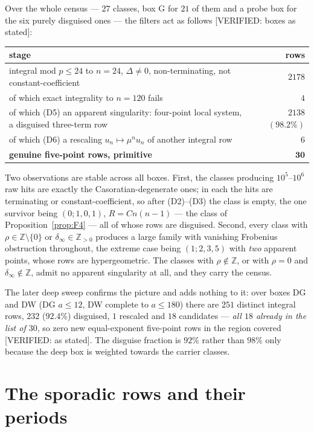 \documentclass[11pt,reqno]{amsart}
\theoremstyle{plain}
\theoremstyle{definition}
\theoremstyle{remark}
\theoremstyle{plain}
\newcommand{\Z}{\mathbb{Z}}
\newcommand{\Verified}[1]{\textup{\textsf{[VERIFIED: #1]}}}
\begin{document}
Over the whole census --- $27$ classes, box G for $21$ of them and a probe box
for the six purely disguised ones --- the filters act as follows
\Verified{boxes as stated}:

\begin{center}\small
\begin{tabular}{lr}
\toprule
stage & rows\\
\midrule
integral mod $p\le24$ to $n=24$, $\Delta\ne0$, non-terminating, not constant-coefficient & $2178$\\
of which exact integrality to $n=120$ fails & $4$\\
of which (D5) an apparent singularity: four-point local system, a disguised three-term row & $2138$ $(98.2\%)$\\
of which (D6) a rescaling $u_n\mapsto\mu^nu_n$ of another integral row & $6$\\
\textbf{genuine five-point rows, primitive} & $\mathbf{30}$\\
\bottomrule
\end{tabular}
\end{center}

Two observations are stable across all boxes. First, the classes producing
$10^5$--$10^6$ raw hits are exactly the Casoratian-degenerate ones; in each the
hits are terminating or constant-coefficient, so after (D2)--(D3) the class is
empty, the one survivor being $(0;1,0,1)$, $R=Cn(n-1)$ --- the class of
Proposition~\ref{prop:F4} --- all of whose rows are disguised. Second, every
class with $\rho\in\Z\setminus\{0\}$ or $\delta_\infty\in\Z_{>0}$ produces a large
family with vanishing Frobenius obstruction throughout, the extreme case being
$(1;2,3,5)$ with \emph{two} apparent points, whose rows are hypergeometric. The
classes with $\rho\notin\Z$, or with $\rho=0$ and $\delta_\infty\notin\Z$, admit
no apparent singularity at all, and they carry the census.

The later deep sweep confirms the picture and adds nothing to it: over boxes DG
and DW (DG $a\le12$, DW complete to $a\le180$) there are $251$ distinct integral
rows, $232$ ($92.4\%$) disguised, $1$ rescaled and $18$ candidates --- \emph{all
$18$ already in the list of $30$}, so zero new equal-exponent five-point rows in
the region covered \Verified{as stated}. The disguise fraction is $92\%$ rather
than $98\%$ only because the deep box is weighted towards the carrier classes.

\section{The sporadic rows and their periods}\label{sec:sporadic}
\end{document}
